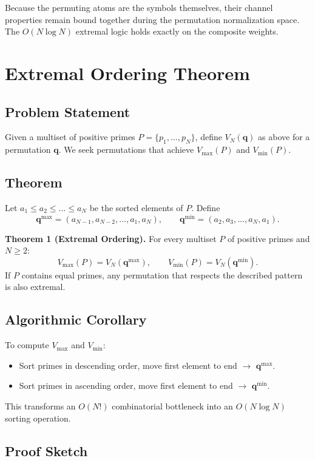 \documentclass[12pt, a4paper]{article}
\begin{document}
Because the permuting atoms are the symbols themselves, their channel properties remain bound together during the permutation normalization space. The $O(N \log N)$ extremal logic holds exactly on the composite weights.

\section{Extremal Ordering Theorem}

\subsection{Problem Statement}

Given a multiset of positive primes $P = \{p_1,\dots,p_N\}$, define $V_N(\mathbf{q})$ as above for a permutation $\mathbf{q}$. We seek permutations that achieve $V_{\max}(P)$ and $V_{\min}(P)$.

\subsection{Theorem}

Let $a_1 \le a_2 \le \dots \le a_N$ be the sorted elements of $P$. Define
\[
\mathbf{q}^{\max} = (a_{N-1}, a_{N-2}, \dots, a_1, a_N), \qquad
\mathbf{q}^{\min} = (a_2, a_3, \dots, a_N, a_1).
\]

\textbf{Theorem 1 (Extremal Ordering).} For every multiset $P$ of positive primes and $N \ge 2$:
\[
V_{\max}(P) = V_N(\mathbf{q}^{\max}), \qquad
V_{\min}(P) = V_N(\mathbf{q}^{\min}).
\]
If $P$ contains equal primes, any permutation that respects the described pattern is also extremal.

\subsection{Algorithmic Corollary}

To compute $V_{\max}$ and $V_{\min}$:
\begin{itemize}
\item Sort primes in descending order, move first element to end $\rightarrow$ $\mathbf{q}^{\max}$.
\item Sort primes in ascending order, move first element to end $\rightarrow$ $\mathbf{q}^{\min}$.
\end{itemize}
This transforms an $O(N!)$ combinatorial bottleneck into an $O(N \log N)$ sorting operation.

\subsection{Proof Sketch}
\end{document}
